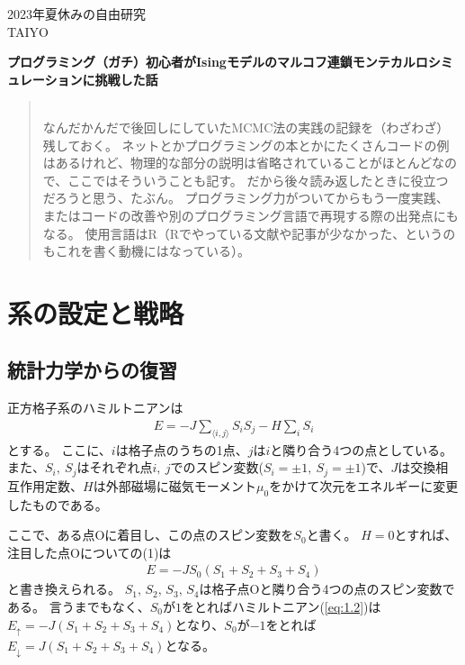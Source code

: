 \documentclass[fontsize = 12pt]{jlreq}
\begin{document}
\begin{flushright}
2023年夏休みの自由研究\\
TAIYO\\

\end{flushright}
\noindent
{\Large%
\textbf{%
プログラミング（ガチ）初心者がIsingモデルのマルコフ連鎖モンテカルロシミュレーションに挑戦した話
}}

\begin{quotation}
\mbox{}\\
\indent
なんだかんだで後回しにしていたMCMC法の実践の記録を（わざわざ）残しておく。
ネットとかプログラミングの本とかにたくさんコードの例はあるけれど、物理的な部分の説明は省略されていることがほとんどなので、ここではそういうことも記す。
だから後々読み返したときに役立つだろうと思う、たぶん。
プログラミング力がついてからもう一度実践、またはコードの改善や別のプログラミング言語で再現する際の出発点にもなる。
使用言語はR（Rでやっている文献や記事が少なかった、というのもこれを書く動機にはなっている）。
\end{quotation}

\section{系の設定と戦略}

\subsection{統計力学からの復習}

正方格子系のハミルトニアンは
\begin{align} \label{eq:1.1}
E = -J \sum_{ \langle i, j \rangle } S_i S_j - H \sum_{i} S_i
\end{align}
とする。
ここに、$i$は格子点のうちの1点、$j$は$i$と隣り合う4つの点としている。
また、$S_i ,~S_j $はそれぞれ点$i,~j$でのスピン変数($S_i = \pm 1,~S_j = \pm 1$)で、$J$は交換相互作用定数、$H$は外部磁場に磁気モーメント$\mu _0$をかけて次元をエネルギーに変更したものである。

ここで、ある点Oに着目し、この点のスピン変数を$S_0 $と書く。
$H = 0$とすれば、注目した点Oについての(1)は
\begin{align} \label{eq:1.2}
E = -J S_0 (S_1 + S_2 + S_3 + S_4 )
\end{align}
と書き換えられる。
$S_1 ,\, S_2 ,\, S_3 ,\, S_4 $は格子点Oと隣り合う4つの点のスピン変数である。
言うまでもなく、$S_0 $が$1$をとればハミルトニアン(\ref{eq:1.2})は$E_\uparrow = -J (S_1 + S_2 + S_3 + S_4 )$となり、$S_0 $が$-1$をとれば$E_\downarrow = J (S_1 + S_2 + S_3 + S_4 )$となる。
\end{document}
